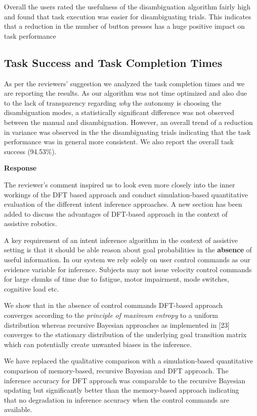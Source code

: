 \documentclass[a4paper,twoside,11pt]{reviewresponse}
\begin{document}
Overall the users rated the usefulness of the disambiguation algorithm fairly high and found that task execution was easier for disambiguating trials. This indicates that a reduction in the number of button presses has a huge positive impact on task performance


\subsection{Task Success and Task Completion Times}
As per the reviewers' suggestion we analyzed the task completion times and we are reporting the results. As our algorithm was not time optimized and also due to the lack of transparency regarding \textit{why} the autonomy is choosing the disambiguation modes, a statistically significant difference was not observed between the manual and disambiguation. However, an overall trend of a reduction in variance was observed in the the disambiguating trials indicating that the task performance was in general more consistent. We also report the overall task success (94.53$\%$). 


\textbf{Response}

The reviewer's comment inspired us to look even more closely into the inner workings of the DFT based approach and conduct simulation-based quantitative evaluation of the different intent inference approaches. 
A new section has been added to discuss the advantages of DFT-based approach in the context of assistive robotics. 

A key requirement of an intent inference algorithm in the context of assistive setting is that it should be able reason about goal probabilities in the \textbf{absence} of useful information. In our system we rely solely on user control commands as our evidence variable for inference. Subjects may not issue velocity control commands for large chunks of time due to fatigue, motor impairment, mode switches, cognitive load etc. 

We show that in the absence of control commands DFT-based approach converges according to the \textit{principle of maximum entropy} to a uniform distribution whereas recursive Bayesian approaches as implemented in [23] converges to the stationary distribution of the underlying goal transition matrix which can potentially create unwanted biases in the inference. 

We have replaced the qualitative comparison with a simulation-based quantitative comparison of memory-based, recursive Bayesian and DFT approach. The inference accuracy for DFT approach was comparable to the recursive Bayesian updating but significantly better than the memory-based approach indicating that no degradation in inference accuracy when the control commands are available. 



%
%
\end{document}
